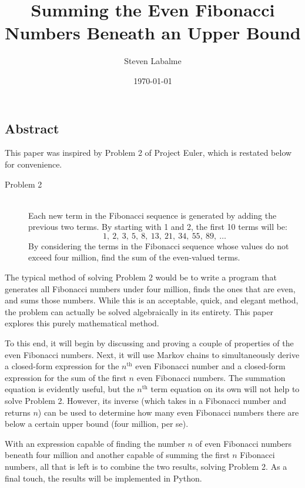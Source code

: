 \documentclass[titlepage]{article}
\title{Summing the Even Fibonacci Numbers Beneath an Upper Bound}
\author{Steven Labalme}
\date{\today}
\begin{document}
\maketitle



\tableofcontents
\newpage



\pagestyle{fancy}
\fancyhf{}
\renewcommand{\headrulewidth}{0pt}
\begin{center}
    \setcounter{secnumdepth}{0}
    \section{Abstract}
    \setcounter{secnumdepth}{3}
\end{center}
This paper was inspired by Problem 2 of Project Euler, which is restated below for convenience.

\vspace{8pt}
\begin{prob}
    \begin{description}
        \item[Problem 2] \hfill \\ Each new term in the Fibonacci sequence is generated by adding the previous two terms. By starting with 1 and 2, the first 10 terms will be:
        \begin{equation*}
            1,\ 2,\ 3,\ 5,\ 8,\ 13,\ 21,\ 34,\ 55,\ 89,\ \dots
        \end{equation*}
        By considering the terms in the Fibonacci sequence whose values do not exceed four million, find the sum of the even-valued terms.
    \end{description}
\end{prob}

The typical method of solving Problem 2 would be to write a program that generates all Fibonacci numbers under four million, finds the ones that are even, and sums those numbers. While this is an acceptable, quick, and elegant method, the problem can actually be solved algebraically in its entirety. This paper explores this purely mathematical method.\par
To this end, it will begin by discussing and proving a couple of properties of the even Fibonacci numbers. Next, it will use Markov chains to simultaneously derive a closed-form expression for the $n^\text{th}$ even Fibonacci number and a closed-form expression for the sum of the first $n$ even Fibonacci numbers. The summation equation is evidently useful, but the $n^\text{th}$ term equation on its own will not help to solve Problem 2. However, its inverse (which takes in a Fibonacci number and returns $n$) can be used to determine how many even Fibonacci numbers there are below a certain upper bound (four million, per se).\par
With an expression capable of finding the number $n$ of even Fibonacci numbers beneath four million and another capable of summing the first $n$ Fibonacci numbers, all that is left is to combine the two results, solving Problem 2. As a final touch, the results will be implemented in Python.
\newpage
\end{document}
